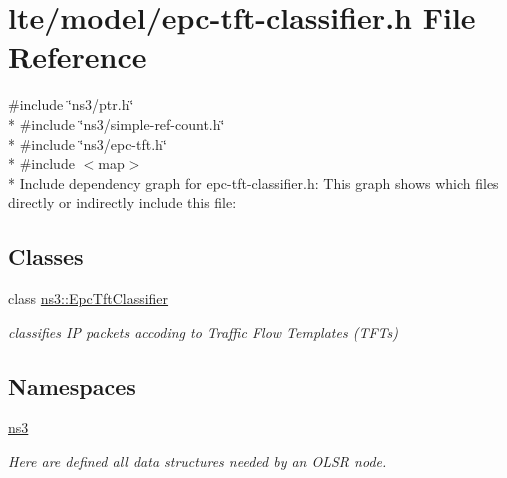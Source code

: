 \hypertarget{epc-tft-classifier_8h}{}\section{lte/model/epc-\/tft-\/classifier.h File Reference}
\label{epc-tft-classifier_8h}
{\ttfamily \#include \char`\"{}ns3/ptr.\+h\char`\"{}}\\*
{\ttfamily \#include \char`\"{}ns3/simple-\/ref-\/count.\+h\char`\"{}}\\*
{\ttfamily \#include \char`\"{}ns3/epc-\/tft.\+h\char`\"{}}\\*
{\ttfamily \#include $<$map$>$}\\*
Include dependency graph for epc-\/tft-\/classifier.h\+:
This graph shows which files directly or indirectly include this file\+:
\subsection*{Classes}
\begin{DoxyCompactItemize}
\item 
class \hyperlink{classns3_1_1EpcTftClassifier}{ns3\+::\+Epc\+Tft\+Classifier}
\begin{DoxyCompactList}\small\item\em classifies IP packets accoding to Traffic Flow Templates (T\+F\+Ts) \end{DoxyCompactList}\end{DoxyCompactItemize}
\subsection*{Namespaces}
\begin{DoxyCompactItemize}
\item 
 \hyperlink{namespacens3}{ns3}
\begin{DoxyCompactList}\small\item\em Here are defined all data structures needed by an O\+L\+SR node. \end{DoxyCompactList}\end{DoxyCompactItemize}
